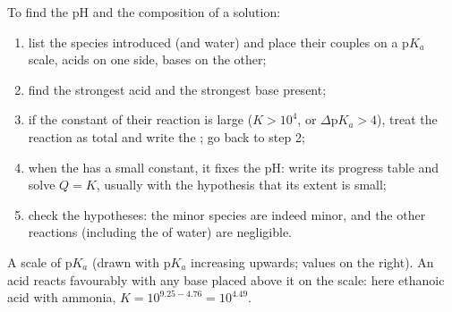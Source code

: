 \begin{method}\label{met:b1:predominant-reaction:method}
To find the pH and the composition of a solution:
\begin{enumerate}
  \item list the species introduced (and water) and place their couples
        on a $\mathrm{p}K_a$ scale, acids on one side, bases on the other;
  \item find the strongest acid and the strongest base present;
  \item if the constant of their reaction is large ($K > 10^4$, or
        $\Delta\mathrm{p}K_a > 4$), treat the reaction as total and write
        the ; go back to step 2;
  \item when the  has a small constant, it fixes the
        pH: write its progress table and solve $Q = K$, usually with the
        hypothesis that its extent is small;
  \item check the hypotheses: the minor species are indeed minor, and
        the other reactions (including the  of water) are
        negligible.
\end{enumerate}
\end{method}

\begin{omfigure}

{\small A scale of $\mathrm{p}K_a$ (drawn with p$K_a$ increasing upwards;
values on the right). An acid reacts favourably with any base placed
above it on the scale: here ethanoic acid with ammonia,
$K = 10^{9.25 - 4.76} = 10^{4.49}$.}
\end{omfigure}

